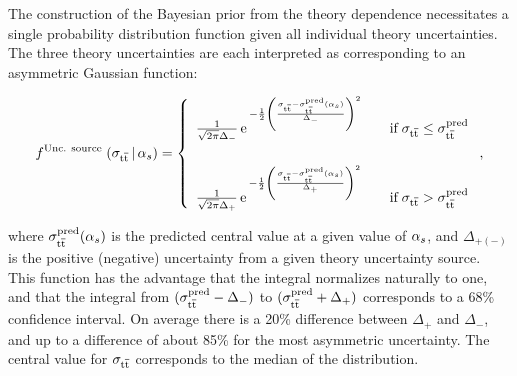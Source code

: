 The construction of the Bayesian prior from the theory dependence
necessitates a single probability distribution function given all
individual theory uncertainties. 
%
The three theory uncertainties are each interpreted as corresponding
to an asymmetric Gaussian function:
%
\begin{linenomath*}
\begin{equation}
f^{\text{Unc. source}} \; (\sigma_{\mathrm{t}\overline{\mathrm{t}}} \,|\, \alpha_s) = 
\left\{
    \begin{array}{ll}
        \frac{1}{\sqrt{2\pi} \Delta_-}
        \, \text{e}  \,^{-\frac12 \left(
        \frac{
            \sigma_{\mathrm{t}\overline{\mathrm{t}}} - \sigma_{\mathrm{t}\overline{\mathrm{t}}}^{\text{pred}}(\alpha_s)
            }{
            \Delta_-
            }
        \right)^2 }
        & \quad \text{if} \; \sigma_{\mathrm{t}\overline{\mathrm{t}}} \leq \sigma_{\mathrm{t}\overline{\mathrm{t}}}^{\text{pred}}
        \\[20pt]
        \frac{1}{\sqrt{2\pi} \Delta_+}
        \, \text{e}  \,^{ -\frac12\left(
        \frac{
            \sigma_{\mathrm{t}\overline{\mathrm{t}}} - \sigma_{\mathrm{t}\overline{\mathrm{t}}}^{\text{pred}}(\alpha_s)
            }{
            \Delta_+
            }        
        \right)^2 }
        & \quad \text{if} \; \sigma_{\mathrm{t}\overline{\mathrm{t}}} > \sigma_{\mathrm{t}\overline{\mathrm{t}}}^{\text{pred}}
    \end{array}
    \right.
,
\label{eq:asymgauss}
\end{equation}
\end{linenomath*}
%
where $\sigma_{\mathrm{t}\overline{\mathrm{t}}}^{\text{pred}}(\alpha_s)$ is the predicted central value at a
given value of $\alpha_s$, and $\Delta_{+(-)}$ is the positive (negative)
uncertainty from a given theory uncertainty source. This function has
the advantage that the integral normalizes naturally to one, and that
the integral from $(\sigma_{\mathrm{t}\overline{\mathrm{t}}}^{\text{pred}}-\Delta_-)$ to
$(\sigma_{\mathrm{t}\overline{\mathrm{t}}}^{\text{pred}}+\Delta_+)$ corresponds to a 68\% 
confidence interval.  
% 
On average there is a 20\% difference between $\Delta_+$ and $\Delta_-$,
and up to a difference of about 85\% for the most asymmetric uncertainty.
%
The central value for $\sigma_{\mathrm{t}\overline{\mathrm{t}}}$ corresponds to the median of the
distribution.

